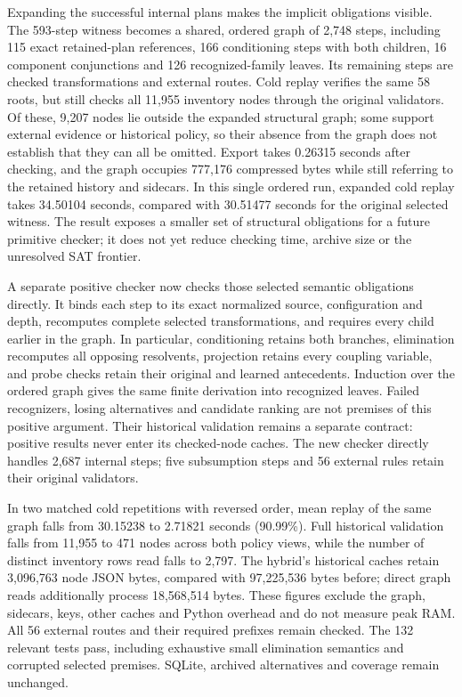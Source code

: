 \documentclass[11pt,a4paper]{article}
\numberwithin{equation}{section}
\theoremstyle{plain}
\theoremstyle{definition}
\theoremstyle{remark}
\begin{document}
Expanding the successful internal plans makes the implicit obligations visible. The 593-step witness becomes a shared, ordered graph of 2,748 steps, including 115 exact retained-plan references, 166 conditioning steps with both children, 16 component conjunctions and 126 recognized-family leaves. Its remaining steps are checked transformations and external routes. Cold replay verifies the same 58 roots, but still checks all 11,955 inventory nodes through the original validators. Of these, 9,207 nodes lie outside the expanded structural graph; some support external evidence or historical policy, so their absence from the graph does not establish that they can all be omitted. Export takes 0.26315 seconds after checking, and the graph occupies 777,176 compressed bytes while still referring to the retained history and sidecars. In this single ordered run, expanded cold replay takes 34.50104 seconds, compared with 30.51477 seconds for the original selected witness. The result exposes a smaller set of structural obligations for a future primitive checker; it does not yet reduce checking time, archive size or the unresolved SAT frontier.

A separate positive checker now checks those selected semantic obligations directly. It binds each step to its exact normalized source, configuration and depth, recomputes complete selected transformations, and requires every child earlier in the graph. In particular, conditioning retains both branches, elimination recomputes all opposing resolvents, projection retains every coupling variable, and probe checks retain their original and learned antecedents. Induction over the ordered graph gives the same finite derivation into recognized leaves. Failed recognizers, losing alternatives and candidate ranking are not premises of this positive argument. Their historical validation remains a separate contract: positive results never enter its checked-node caches. The new checker directly handles 2,687 internal steps; five subsumption steps and 56 external rules retain their original validators.

In two matched cold repetitions with reversed order, mean replay of the same graph falls from 30.15238 to 2.71821 seconds (90.99\%). Full historical validation falls from 11,955 to 471 nodes across both policy views, while the number of distinct inventory rows read falls to 2,797. The hybrid's historical caches retain 3,096,763 node JSON bytes, compared with 97,225,536 bytes before; direct graph reads additionally process 18,568,514 bytes. These figures exclude the graph, sidecars, keys, other caches and Python overhead and do not measure peak RAM. All 56 external routes and their required prefixes remain checked. The 132 relevant tests pass, including exhaustive small elimination semantics and corrupted selected premises. SQLite, archived alternatives and coverage remain unchanged.
\end{document}
